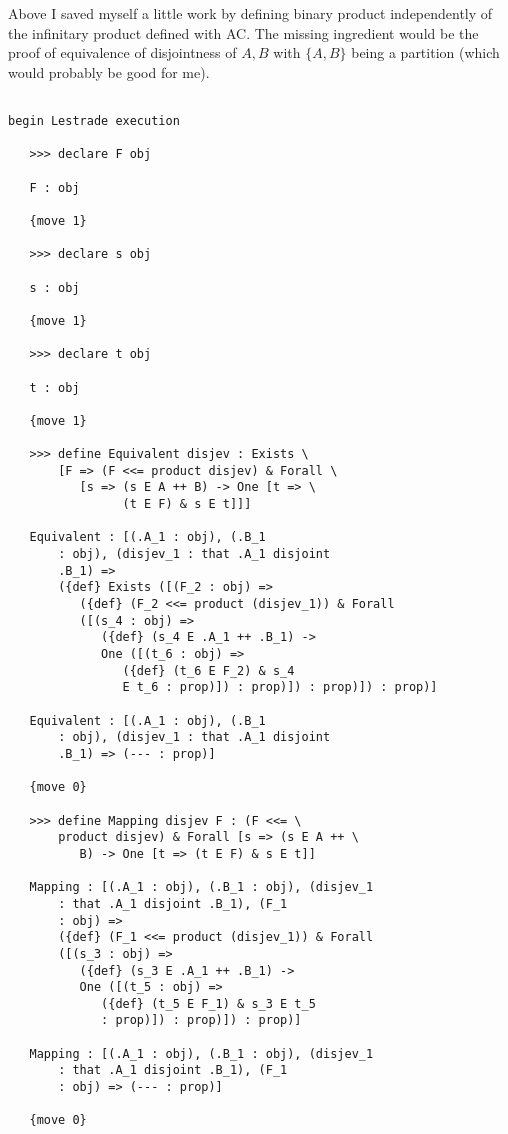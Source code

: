 \documentclass[12pt]{article}
\begin{document}
Above I saved myself a little work by defining binary product independently of the infinitary product defined with AC.  The missing ingredient would be the proof of equivalence
of disjointness of $A,B$ with $\{A,B\}$ being a partition (which would probably be good for me).

\begin{verbatim}

begin Lestrade execution

   >>> declare F obj

   F : obj

   {move 1}

   >>> declare s obj

   s : obj

   {move 1}

   >>> declare t obj

   t : obj

   {move 1}

   >>> define Equivalent disjev : Exists \
       [F => (F <<= product disjev) & Forall \
          [s => (s E A ++ B) -> One [t => \
                (t E F) & s E t]]]

   Equivalent : [(.A_1 : obj), (.B_1 
       : obj), (disjev_1 : that .A_1 disjoint 
       .B_1) => 
       ({def} Exists ([(F_2 : obj) => 
          ({def} (F_2 <<= product (disjev_1)) & Forall 
          ([(s_4 : obj) => 
             ({def} (s_4 E .A_1 ++ .B_1) -> 
             One ([(t_6 : obj) => 
                ({def} (t_6 E F_2) & s_4 
                E t_6 : prop)]) : prop)]) : prop)]) : prop)]

   Equivalent : [(.A_1 : obj), (.B_1 
       : obj), (disjev_1 : that .A_1 disjoint 
       .B_1) => (--- : prop)]

   {move 0}

   >>> define Mapping disjev F : (F <<= \
       product disjev) & Forall [s => (s E A ++ \
          B) -> One [t => (t E F) & s E t]]

   Mapping : [(.A_1 : obj), (.B_1 : obj), (disjev_1 
       : that .A_1 disjoint .B_1), (F_1 
       : obj) => 
       ({def} (F_1 <<= product (disjev_1)) & Forall 
       ([(s_3 : obj) => 
          ({def} (s_3 E .A_1 ++ .B_1) -> 
          One ([(t_5 : obj) => 
             ({def} (t_5 E F_1) & s_3 E t_5 
             : prop)]) : prop)]) : prop)]

   Mapping : [(.A_1 : obj), (.B_1 : obj), (disjev_1 
       : that .A_1 disjoint .B_1), (F_1 
       : obj) => (--- : prop)]

   {move 0}


\end{verbatim}
\end{document}
